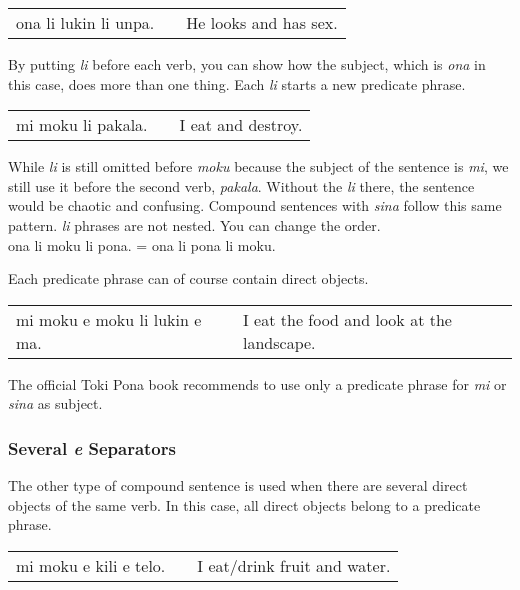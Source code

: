 \begin{supertabular}{p{5,5cm}|ll}
ona li lukin li unpa. && He looks and has sex. \\
\end{supertabular} 

By putting \textit{li} before each verb, you can show how the subject, which is \textit{ona} in this case, does more than one thing. 
Each \textit{li} starts a new predicate phrase. 

\begin{supertabular}{p{5,5cm}|ll}
mi moku li pakala. && I eat and destroy. \\
\end{supertabular} 

While \textit{li} is still omitted before \textit{moku} because the subject of the sentence is \textit{mi}, we still use it before the second verb, \textit{pakala}. 
Without the \textit{li} there, the sentence would be chaotic and confusing. 
Compound sentences with \textit{sina} follow this same pattern. 
\textit{li} phrases are not nested. You can change the order. \\
ona li moku li pona. = ona li pona li moku. 

Each predicate phrase can of course contain direct objects. 

\begin{supertabular}{p{5,5cm}|ll}
mi moku e moku li lukin e ma. && I eat the food and look at the landscape. \\
\end{supertabular} 

The official Toki Pona book recommends to use only a predicate phrase for \textit{mi} or \textit{sina} as subject. 
%
\label{'multiple_e'}
\subsubsection*{Several \textit{e} Separators}
%
The other type of compound sentence is used when there are several direct objects of the same verb.
In this case, all direct objects belong to a predicate phrase. 

\begin{supertabular}{p{5,5cm}|ll}
mi moku e kili e telo. && I eat/drink fruit and water. \\
\end{supertabular} 

